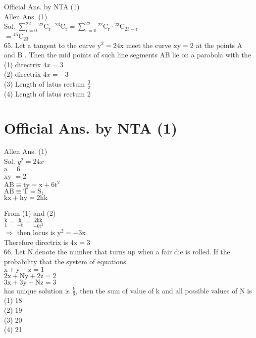 \documentclass[10pt]{article}
\begin{document}
Official Ans. by NTA (1)\\
Allen Ans. (1)\\
Sol. \(\sum_{\mathrm{r}=0}^{22}{ }^{22} \mathrm{C}_{\mathrm{r}} \cdot{ }^{23} \mathrm{C}_{\mathrm{r}}=\sum_{\mathrm{r}=0}^{22}{ }^{22} \mathrm{C}_{\mathrm{r}} \cdot{ }^{23} \mathrm{C}_{23-\mathrm{r}}\)\\
\(={ }^{45} \mathrm{C}_{23}\)\\
65. Let a tangent to the curve \(\mathrm{y}^{2}=24 \mathrm{x}\) meet the curve \(\mathrm{xy}=2\) at the points A and B . Then the mid points of such line segments AB lie on a parabola with the\\
(1) directrix \(4 x=3\)\\
(2) directrix \(4 x=-3\)\\
(3) Length of latus rectum \(\frac{3}{2}\)\\
(4) Length of latus rectum 2

\section*{Official Ans. by NTA (1)}
Allen Ans. (1)\\
Sol. \(y^{2}=24 x\)\\
\(\mathrm{a}=6\)\\
xy \(=2\)\\
\(\mathrm{AB} \equiv \mathrm{ty}=\mathrm{x}+6 \mathrm{t}^{2}\)\\
\(\mathrm{AB} \equiv \mathrm{T}=\mathrm{S}_{1}\)\\
\(\mathrm{kx}+\mathrm{hy}=2 \mathrm{hk}\)

From (1) and (2)\\
\(\frac{\mathrm{k}}{1}=\frac{\mathrm{h}}{-\mathrm{t}}=\frac{2 \mathrm{hk}}{-6 \mathrm{t}^{2}}\)\\
\(\Rightarrow\) then locus is \(\mathrm{y}^{2}=-3 \mathrm{x}\)\\
Therefore directrix is \(4 \mathrm{x}=3\)\\
66. Let N denote the number that turns up when a fair die is rolled. If the probability that the system of equations\\
\(\mathrm{x}+\mathrm{y}+\mathrm{z}=1\)\\
\(2 \mathrm{x}+\mathrm{Ny}+2 \mathrm{z}=2\)\\
\(3 \mathrm{x}+3 \mathrm{y}+\mathrm{Nz}=3\)\\
has unique solution is \(\frac{k}{6}\), then the sum of value of k and all possible values of N is\\
(1) 18\\
(2) 19\\
(3) 20\\
(4) 21
\end{document}
